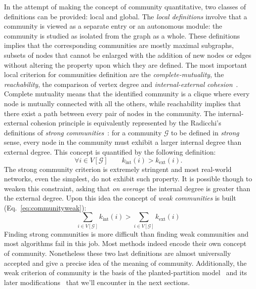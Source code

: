 In the attempt of making the concept of community quantitative, two classes of definitions can be provided: local and global.
The \emph{local definitions} involve that a community is viewed as a separate entry or an autonomous module: the community is studied as isolated from the graph as a whole.
These definitions implies that the corresponding communities are mostly maximal subgraphs, subsets of nodes that cannot be enlarged with the addition of new nodes or edges without altering the property upon which they are defined.
The most important local criterion for communities definition are the \emph{complete-mutuality}, the \emph{reachability}, the comparison of vertex degree and \emph{internal-external cohesion}~\cite{wasserman1994,alba1973}.
Complete mutuality means that the identified community is a clique where every node is mutually connected with all the others, while reachability implies that there exist a path between every pair of nodes in the community.
The internal- external cohesion principle is equivalently represented by the Radicchi's definitions of \emph{strong communities}~\cite{radicchi2004}: for a community $\mathcal{G}$ to be defined in \emph{strong} sense, every node in the community must exhibit a larger internal degree than external degree. This concept is quantified by the following definition:
\begin{equation}\label{eq:strongcommunities}
\forall i \in V[ \mathcal{G} ] \qquad k_{\textrm{int}}(i) > k_{\textrm{ext}}(i).
\end{equation}
The strong community criterion is extremely stringent and most real-world networks, even the simplest, do not exhibit such property.
It is possible though to weaken this constraint, asking that \emph{on average} the internal degree is greater than the external degree.
Upon this idea the concept of \emph{weak communities} is built (Eq.~\ref{eq:communityweak}):
\begin{equation}\label{eq:communityweak}
\sum \limits_{i \in V[\mathcal{G}]} k_{\textrm{int}}(i) > \sum \limits_{i \in V[\mathcal{G}]} k_{\textrm{ext}}(i)
\end{equation}
Finding strong communities is more difficult than finding weak communities and most algorithms fail in this job. Most methods indeed encode their own concept of community.
Nonetheless these two last definitions are almost universally accepted and give a precise idea of the meaning of community.
Additionally, the weak criterion of community is the basis of the planted-partition model~\cite{condon2000} and its later modifications~\cite{lancichinetti2008} that we'll encounter in the next sections.

